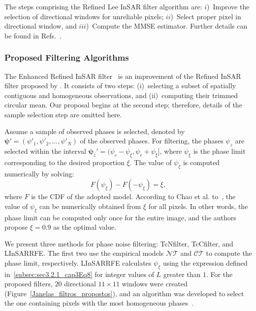 \documentclass[remotesensing,article,submit,pdftex,moreauthors]{Definitions/mdpi}
\begin{document}
The steps comprising the Refined Lee InSAR filter algorithm are: 
$i$)~Improve the selection of directional windows for unreliable pixels; 
$ii$)~Select proper pixel in directional window, 
and $iii$)~Compute the MMSE estimator. 
Further details can be found in Refs.~\cite{RefinedFilteringofInterferometricPhaseFromInSARData, EnhancedInterferometricPhaseNoiseFilteringoftheRefinedInSARFilter}.

\subsubsection{Proposed Filtering Algorithms}\label{sec:pro}

The Enhanced Refined InSAR filter~\cite{EnhancedInterferometricPhaseNoiseFilteringoftheRefinedInSARFilter} is an improvement of the Refined InSAR filter proposed by \citet{RefinedFilteringofInterferometricPhaseFromInSARData}.
It consists of two steps: 
(i)~selecting a subset of spatially contiguous and homogeneous observations, 
and (ii)~computing their trimmed circular mean.
Our proposal begins at the second step; therefore, details of the sample selection step are omitted here.

Assume a sample of observed phases is selected, denoted by $\bm{\psi'} = (\psi'_1, \psi'_2, \dots, \psi'_N)$ of the observed phases. For filtering, the phases $\psi_z$ are selected within the interval $\bm\psi_z' = (\psi_c - \psi_\xi, \psi_c + \psi_\xi]$, where $\psi_\xi$ is the phase limit corresponding to the desired proportion $\xi$. The value of $\psi_\xi$ is computed numerically by solving:
\begin{equation}\label{Eq_limite_fase}
	F(\psi_\xi) - F(-\psi_\xi) = \xi,
\end{equation}
where $F$ is the CDF of the adopted model. According to Chao et al. to~\cite{RefinedFilteringofInterferometricPhaseFromInSARData}, the value of $\psi_\xi$ can be numerically obtained from $\xi$ for all pixels. 
In other words, the phase limit can be computed only once for the entire image, and the authors propose $\xi=0.9$ as the optimal value.

We present three methods for phase noise filtering: TcNfilter, TcCfilter, and LInSARRFE. 
The first two use the empirical models $\mathcal{NT}$ and $\mathcal{CT}$ to compute the phase limit, respectively. 
LInSARRFE calculates $\psi_{\xi}$ using the expression defined in~\eqref{subsec:sec3.2.1_cap3Eq8} for integer values of $L$ greater than $1$. For the proposed filters, $20$ directional $11\times11$ windows were created (Figure~\ref{Janelas_filtros_propostos}), and an algorithm was developed to select the one containing pixels with the most homogeneous phases~\cite{EnhancedInterferometricPhaseNoiseFilteringoftheRefinedInSARFilter}.
\end{document}
